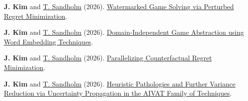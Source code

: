 \documentclass{article}
\begin{document}
	\begin{etaremune}
		\item \textbf{J. Kim} and \href{https://www.cs.cmu.edu/~sandholm/}{T. Sandholm} (2026). \href{https://doi.org/10.48550/arXiv.2608.14977}{Watermarked Game Solving via Perturbed Regret Minimization}.
		\item \textbf{J. Kim} and \href{https://www.cs.cmu.edu/~sandholm/}{T. Sandholm} (2026). \href{https://doi.org/10.48550/arXiv.2605.15543}{Domain-Independent Game Abstraction using Word Embedding Techniques}.
		\item \textbf{J. Kim} and \href{https://www.cs.cmu.edu/~sandholm/}{T. Sandholm} (2026). \href{https://doi.org/10.48550/arXiv.2605.14277}{Parallelizing Counterfactual Regret Minimization}.
		\item \textbf{J. Kim} and \href{https://www.cs.cmu.edu/~sandholm/}{T. Sandholm} (2026). \href{https://doi.org/10.48550/arXiv.2605.14261}{Heuristic Pathologies and Further Variance Reduction via Uncertainty Propagation in the AIVAT Family of Techniques}.
		\iftoggle{verbose}{
			\item \textbf{J. Kim} (2025). \href{https://doi.org/10.48550/arXiv.2408.14778}{GPU-Accelerated Counterfactual Regret Minimization}.
			\item A. Raeisdanaei, \textbf{J. Kim}, M. Liao, and S. Kochhar (2025). \href{https://doi.org/10.48550/arXiv.2503.12043}{An LLM-Integrated Framework for Completion, Management, and Tracing of STPA}.
			\item \textbf{J. Kim} (2023). \href{https://doi.org/10.48550/arXiv.2311.07623}{PadChannel: Improving CNN Performance through Explicit Padding Encoding}.
		}{}
	\end{etaremune}

	\iftoggle{verbose}{
		\subsection*{Selected Presentations}

		\begin{etaremune}
			\item \textbf{J. Kim}, M. Guerzhoy (2024). Observing the Southern US Culture of Honor Using Large-Scale Social Media Analysis. In: \textit{10\textsuperscript{th} International Conference on Computational Social Science IC\textsuperscript{2}S\textsuperscript{2}}. (Extended abstract, poster, acceptance rate: 88.6\%)
			\item \textbf{J. Kim} (May 16, 2024). Variance Reduction Techniques and their Applications to Poker. In: \textit{AceGuardian Seminar}.
		\end{etaremune}
	}{}
\end{document}
